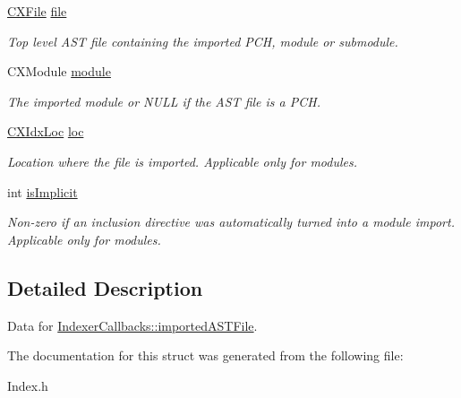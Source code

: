 \begin{DoxyCompactItemize}
\item 
\mbox{\label{structCXIdxImportedASTFileInfo_a27dad72f207ae72a8b311214c21949cb}} 
\mbox{\hyperlink{group__CINDEX__FILES_gacfcea9c1239c916597e2e5b3e109215a}{C\+X\+File}} \mbox{\hyperlink{structCXIdxImportedASTFileInfo_a27dad72f207ae72a8b311214c21949cb}{file}}
\begin{DoxyCompactList}\small\item\em Top level A\+ST file containing the imported P\+CH, module or submodule. \end{DoxyCompactList}\item 
\mbox{\label{structCXIdxImportedASTFileInfo_add8154ffb15b3a72dcee20de324cdb64}} 
C\+X\+Module \mbox{\hyperlink{structCXIdxImportedASTFileInfo_add8154ffb15b3a72dcee20de324cdb64}{module}}
\begin{DoxyCompactList}\small\item\em The imported module or N\+U\+LL if the A\+ST file is a P\+CH. \end{DoxyCompactList}\item 
\mbox{\label{structCXIdxImportedASTFileInfo_a1be0a497d769a719f6008b2558181dbe}} 
\mbox{\hyperlink{structCXIdxLoc}{C\+X\+Idx\+Loc}} \mbox{\hyperlink{structCXIdxImportedASTFileInfo_a1be0a497d769a719f6008b2558181dbe}{loc}}
\begin{DoxyCompactList}\small\item\em Location where the file is imported. Applicable only for modules. \end{DoxyCompactList}\item 
\mbox{\label{structCXIdxImportedASTFileInfo_a307ecc7457bd9d3d28339fa781c8345e}} 
int \mbox{\hyperlink{structCXIdxImportedASTFileInfo_a307ecc7457bd9d3d28339fa781c8345e}{is\+Implicit}}
\begin{DoxyCompactList}\small\item\em Non-\/zero if an inclusion directive was automatically turned into a module import. Applicable only for modules. \end{DoxyCompactList}\end{DoxyCompactItemize}


\subsection{Detailed Description}
Data for \mbox{\hyperlink{structIndexerCallbacks_a75672a9934f69854080bee3fbc0e3994}{Indexer\+Callbacks\+::imported\+A\+S\+T\+File}}. 

The documentation for this struct was generated from the following file\+:\begin{DoxyCompactItemize}
\item 
Index.\+h\end{DoxyCompactItemize}
